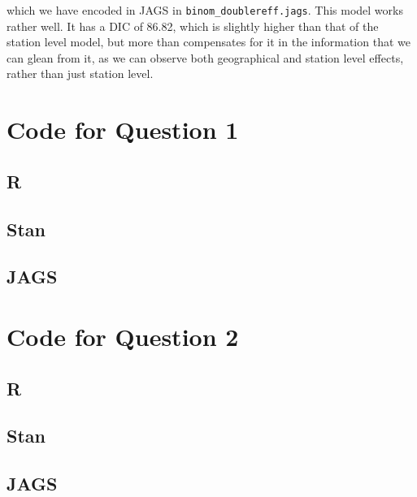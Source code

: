 \documentclass[12pt]{extarticle}
\begin{document}
which we have encoded in JAGS in \texttt{binom\_doublereff.jags}. This model works rather well. It has a DIC of 86.82, which is slightly higher than that of the station level model, but more than compensates for it in the information that we can glean from it, as we can observe both geographical and station level effects, rather than just station level. 
\printbibliography

\newpage

\appendix

\section{Code for Question 1}
\subsection{R}
\label{code:main_1}
\subsection{Stan}
\label{code:stan_1}
\subsection{JAGS}
\label{code:jags_1}
\section{Code for Question 2}
\subsection{R}
\label{code:main_2}
\subsection{Stan}
\label{code:stan_2}
\subsection{JAGS}
\label{code:jags_2}
\end{document}
